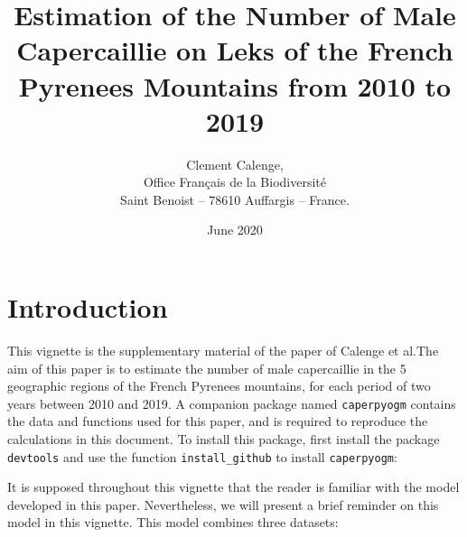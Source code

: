 \documentclass[a4paper]{article}
\title{ Estimation of the Number of Male Capercaillie on Leks of the
  French Pyrenees Mountains from 2010 to 2019 }
\author{Clement Calenge,\\
  Office Fran\c{c}ais de la Biodiversit\'{e}\\
  Saint Benoist -- 78610 Auffargis -- France.}
\date{June 2020}
\newenvironment{Default Paragraph Font}{}{}
\begin{document}
\maketitle
\tableofcontents





\newpage

\section*{Introduction}


This vignette is the supplementary material of the paper of Calenge et
al.The aim of this paper is to estimate the number of male
capercaillie in the 5 geographic regions of the French Pyrenees
mountains, for each period of two years between 2010 and 2019. A
companion package named \texttt{caperpyogm} contains the data and
functions used for this paper, and is required to reproduce the
calculations in this document. To install this package, first install
the package \texttt{devtools} and use the function
\texttt{install\_github} to install \texttt{caperpyogm}:

\begin{knitrout}
\color{fgcolor}\begin{kframe}
\begin{alltt}
\hlstd{(}\hlstd{)}

\hlopt{::}\hlstd{(}\hlstd{)}
\end{alltt}
\end{kframe}
\end{knitrout}

It is supposed throughout this vignette that the reader is familiar
with the model developed in this paper. Nevertheless, we will present
a brief reminder on this model in this vignette. This model combines
three datasets:\\
\end{document}
